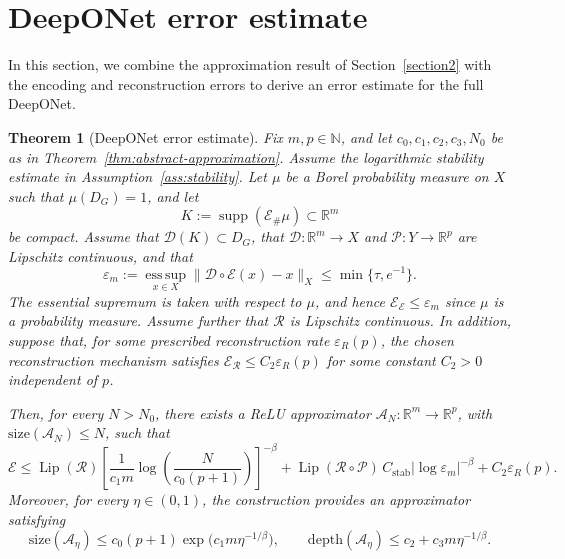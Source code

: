 \documentclass{article}
\numberwithin{equation}{section}
\theoremstyle{plain}
\newtheorem{theorem}{Theorem}[section]
\newcommand{\Lip}{\operatorname{Lip}}
\begin{document}
	\section{DeepONet error estimate}\label{section3}
	In this section, we combine the approximation result of Section~\ref{section2} with the encoding and reconstruction errors to derive an error estimate for the full DeepONet.
	\begin{theorem}[DeepONet error estimate]\label{thm:error-decomposition}
		Fix $m,p\in\mathbb N$, and let $c_0,c_1,c_2,c_3,N_0$ be as in Theorem~\ref{thm:abstract-approximation}. Assume the logarithmic stability estimate in Assumption~\ref{ass:stability}. Let $\mu$ be a Borel probability measure on $X$ such that $\mu(D_G)=1$, and let
		\begin{equation*}
			K:=\operatorname{supp}(\mathcal E_\#\mu)\subset \mathbb R^m
		\end{equation*}
		be compact. Assume that $\mathcal D(K)\subset D_G$, that $\mathcal D:\mathbb R^m\to X$ and $\mathcal P:Y\to\mathbb R^p$ are Lipschitz continuous, and that
		\begin{equation*}
			\varepsilon_m
			:=
			\operatorname*{ess\,sup}_{x\in X}
			\|\mathcal D\circ\mathcal E(x)-x\|_X
			\le \min\{\tau,e^{-1}\}.
		\end{equation*}
		The essential supremum is taken with respect to $\mu$, and hence $\mathscr E_{\mathcal E}\le\varepsilon_m$ since $\mu$ is a probability measure. Assume further that $\mathcal R$ is Lipschitz continuous. In addition, suppose that, for some prescribed reconstruction rate $\varepsilon_R(p)$, the chosen reconstruction mechanism satisfies $\mathscr E_{\mathcal R} \le C_2 \varepsilon_R(p)$ for some constant $C_2>0$ independent of $p$.
		
		Then, for every $N>N_0$, there exists a ReLU approximator
		$\mathcal A_N:\mathbb R^m\to\mathbb R^p$, with
		$\mathrm{size}(\mathcal A_N)\le N$, such that
		\begin{equation}\label{total-error}
			\mathscr E
			\le
			\Lip(\mathcal R)
			\left[
			\frac{1}{c_1m}
			\log\!\left(\frac{N}{c_0(p+1)}\right)
			\right]^{-\beta}
			+
			\Lip(\mathcal R\circ\mathcal P)\,C_{\mathrm{stab}}|\log\varepsilon_m|^{-\beta}
			+
			C_2\varepsilon_R(p).
		\end{equation}
		Moreover,
			for every $\eta\in(0,1)$, the construction provides an approximator satisfying
			\begin{equation*}
				\mathrm{size}(\mathcal A_\eta)
				\le c_0(p+1)\exp \bigl(c_1m\eta^{-1/\beta}\bigr),
				\qquad
				\mathrm{depth}(\mathcal A_\eta)
				\le c_2+c_3m\eta^{-1/\beta}.
			\end{equation*}
	\end{theorem}
	
\end{document}
